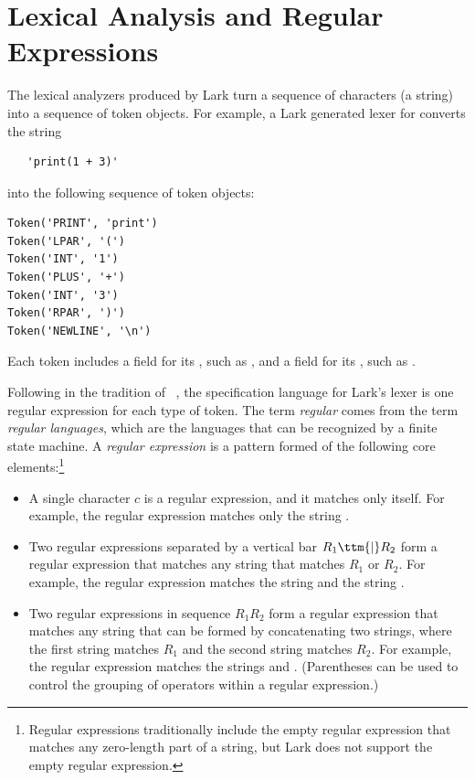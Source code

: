 \documentclass[7x10]{TimesAPriori_MIT}%
\numberwithin{theorem}{chapter}
\numberwithin{definition}{chapter}
\numberwithin{equation}{chapter}
\begin{document}
{\section{Lexical Analysis and Regular Expressions}
\label{sec:lex}

The lexical analyzers produced by Lark turn a sequence of characters
(a string) into a sequence of token objects. For example, a Lark
generated lexer for \LangInt{} converts the string
\begin{lstlisting}
   'print(1 + 3)'
\end{lstlisting}
\noindent into the following sequence of token objects:
\begin{center}
\begin{minipage}{0.95\textwidth}
\begin{lstlisting}
Token('PRINT', 'print')
Token('LPAR', '(')
Token('INT', '1')
Token('PLUS', '+')
Token('INT', '3')
Token('RPAR', ')')
Token('NEWLINE', '\n')
\end{lstlisting}
\end{minipage}
\end{center}
Each token includes a field for its , such as ,
and a field for its , such as .

Following in the tradition of ~\citep{Lesk:1975uq}, the
specification language for Lark's lexer is one regular expression for
each type of token. The term \emph{regular} comes from the term
\emph{regular languages}, which are the languages that can be
recognized by a finite state machine. A \emph{regular expression} is a
pattern formed of the following core elements:\footnote{Regular expressions traditionally include the
  empty regular expression that matches any zero-length part of a
  string, but Lark does not support the empty regular expression.}
\begin{itemize}
\item A single character $c$ is a regular expression, and it matches
  only itself. For example, the regular expression  matches
  only the string .
  
\item Two regular expressions separated by a vertical bar $R_1 \ttm{|}
  R_2$ form a regular expression that matches any string that matches
  $R_1$ or $R_2$. For example, the regular expression 
  matches the string  and the string .

\item Two regular expressions in sequence $R_1 R_2$ form a regular
  expression that matches any string that can be formed by
  concatenating two strings, where the first string matches $R_1$ and
  the second string matches $R_2$. For example, the regular expression
   matches the strings  and .
  (Parentheses can be used to control the grouping of operators within
  a regular expression.)


\end{itemize}}
\end{document}
